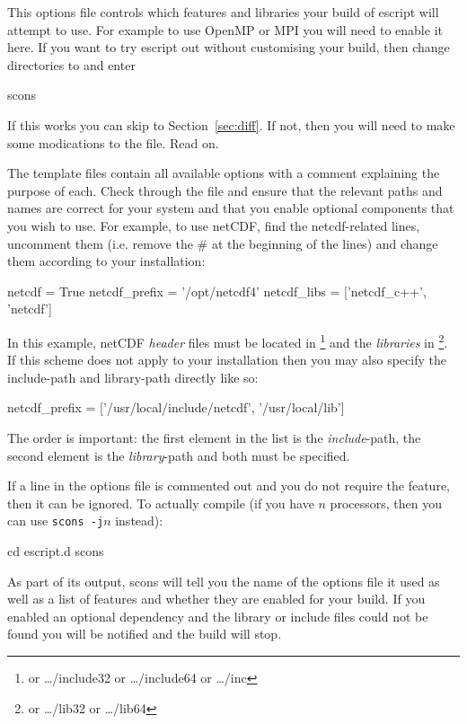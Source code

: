 This options file controls which features and libraries your build of escript will attempt to use.
For example to use OpenMP or MPI you will need to enable it here.
If you want to try escript out without customising your build, then change
directories to  and enter
\begin{shellCode}
scons 
\end{shellCode}
If this works you can skip to Section~\ref{sec:diff}.
If not, then you will need to make some modications to the file.
Read on.

The template files contain all available options with a comment explaining the
purpose of each.
Check through the file and ensure that the relevant paths and names are correct
for your system and that you enable optional components that you wish to use.
For example, to use netCDF, find the netcdf-related lines, uncomment them
(i.e. remove the \# at the beginning of the lines) and change them according
to your installation:
\begin{shellCode}
netcdf = True
netcdf_prefix = '/opt/netcdf4'
netcdf_libs = ['netcdf_c++', 'netcdf']
\end{shellCode}

In this example, netCDF \emph{header} files must be located in
\footnote{or \ldots/include32 or \ldots/include64 or \ldots/inc}
and the \emph{libraries} in \footnote{or \ldots/lib32 or \ldots/lib64}.
If this scheme does not apply to your installation then you may also specify
the include-path and library-path directly like so:
\begin{shellCode}
netcdf_prefix = ['/usr/local/include/netcdf', '/usr/local/lib']
\end{shellCode}
The order is important: the first element in the list is the
\emph{include}-path, the second element is the \emph{library}-path and both
must be specified.

If a line in the options file is commented out and you do not require the
feature, then it can be ignored.
To actually compile (if you have $n$ processors, then you can use \texttt{scons -j$n$} instead):

\begin{shellCode}
cd escript.d
scons
\end{shellCode}

As part of its output, scons will tell you the name of the options file it used
as well as a list of features and whether they are enabled for your build.
If you enabled an optional dependency and the library or include files could
not be found you will be notified and the build will stop.

